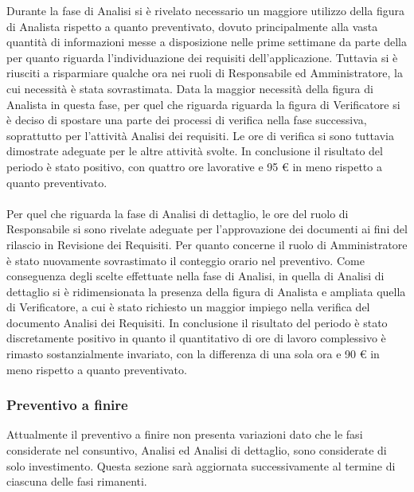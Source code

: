 Durante la fase di Analisi si è rivelato necessario un maggiore utilizzo della figura di Analista rispetto a quanto preventivato, dovuto principalmente alla vasta quantità di informazioni messe a disposizione nelle prime settimane da parte della   per quanto riguarda l'individuazione dei requisiti dell'applicazione. Tuttavia si è riusciti a risparmiare qualche ora nei ruoli di Responsabile ed Amministratore, la cui necessità è stata sovrastimata. Data la maggior necessità della figura di Analista in questa fase, per quel che riguarda riguarda la figura di Verificatore si è deciso di spostare una parte dei processi di verifica nella fase successiva, soprattutto per l'attività Analisi dei requisiti. Le ore di verifica si sono tuttavia dimostrate adeguate per le altre attività svolte. In conclusione il risultato del periodo è stato positivo, con quattro ore lavorative e 95 \euro{} in meno rispetto a quanto preventivato. \\\\
Per quel che riguarda la fase di Analisi di dettaglio, le ore del ruolo di Responsabile si sono rivelate adeguate per l'approvazione dei documenti ai fini del rilascio in Revisione dei Requisiti. Per quanto concerne il ruolo di Amministratore è stato nuovamente sovrastimato il conteggio orario nel preventivo. Come conseguenza degli scelte effettuate nella fase di Analisi, in quella di Analisi di dettaglio si è ridimensionata la presenza della figura di Analista e ampliata quella di Verificatore, a cui è stato richiesto un maggior impiego nella verifica del documento Analisi dei Requisiti. In conclusione il risultato del periodo è stato discretamente positivo in quanto il quantitativo di ore di lavoro complessivo è rimasto sostanzialmente invariato, con la differenza di una sola ora e 90 \euro{} in meno rispetto a quanto preventivato.

\subsubsection{Preventivo a finire}
Attualmente il preventivo a finire non presenta variazioni dato che le fasi considerate nel consuntivo, Analisi ed Analisi di dettaglio, sono considerate di solo investimento. Questa sezione sarà aggiornata successivamente al termine di ciascuna delle fasi rimanenti.